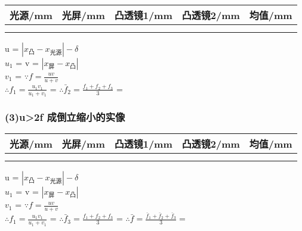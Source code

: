 \documentclass[11pt,a4paper,oneside]{article}
\begin{document}
\begin{center}

\begin{tabular}{|c|c|c|c|c|}
\hline 
光源/mm & 光屏/mm & 凸透镜1/mm & 凸透镜2/mm & 均值/mm \\ 
\hline 
{%
{%
{%
{%
& %
{%
{%
\\
\hline
{%
\end{tabular}
\vspace{10pt}
\end{center}
u = $\left | {x}_{\text{凸}} - {x}_{\text{光源}} \right | - {\delta}$\\
${u}_1$ = %
v = $\left | {x}_{\text{屏}} - {x}_{\text{凸}} \right |$\\
${v}_1$ = %
$\because f = \frac{uv}{u+v}$\\
$\therefore {f}_1 = \frac{{u}_1{v}_1}{{u}_1+{v}_1}$ = %
$\therefore {\bar{f}}_2 = \frac{{f}_1+{f}_2+{f}_3}{3}$ = %

\subsubsection*{(3)u>2f 成倒立缩小的实像}

\begin{center}

\begin{tabular}{|c|c|c|c|c|}
\hline 
光源/mm & 光屏/mm & 凸透镜1/mm & 凸透镜2/mm & 均值/mm \\ 
\hline 
{%
{%
{%
{%
& %
{%
{%
\\
\hline
{%
\end{tabular}
\vspace{10pt}
\end{center}
u = $\left | {x}_{\text{凸}} - {x}_{\text{光源}} \right | - {\delta}$\\
${u}_1$ = %
v = $\left | {x}_{\text{屏}} - {x}_{\text{凸}} \right |$\\
${v}_1$ = %
$\because f = \frac{uv}{u+v}$\\
$\therefore {f}_1 = \frac{{u}_1{v}_1}{{u}_1+{v}_1}$ = %
$\therefore {\bar{f}}_3 = \frac{{f}_1+{f}_2+{f}_3}{3}$ = %
$\therefore {\bar{f}} = \frac{\bar{f}_1+\bar{f}_2+\bar{f}_3}{3} = $%
\end{document}
